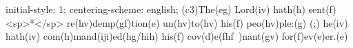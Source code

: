 initial-style: 1;
centering-scheme: english;
(c3)The(eg) Lord(iv) hath(h) sent(f) <sp>*</sp> re(hv)demp(gf)tion(e) un(hv)to(hv) his(f) peo(hv)ple:(g) (;) he(iv) hath(iv) com(h)mand(iji)ed(hg/hih) his(f) cov(d)e(fhf~)nant(gv) for(f)ev(e)er.(e)

